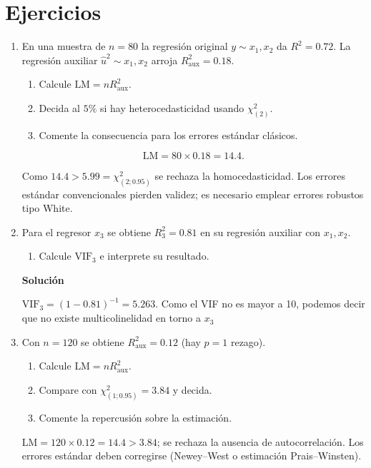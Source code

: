 \documentclass[10pt,a4paper]{article}
\begin{document}
\section{Ejercicios}

\begin{enumerate}
    \item En una muestra de $n=80$ la regresión original $y\sim x_1,x_2$ da
$R^{2}=0.72$.  
La regresión auxiliar $\hat u^{2}\sim x_1,x_2$ arroja 
$R^{2}_{\text{aux}}=0.18$.

\begin{enumerate}
\item Calcule $\text{LM}=nR^{2}_{\text{aux}}$.
\item Decida al $5\%$ si hay heterocedasticidad 
      usando $\chi^{2}_{(2)}$.
\item Comente la consecuencia para los errores estándar clásicos.
\end{enumerate}

\[
\text{LM}=80\times0.18=14.4.
\]

Como $14.4>5.99=\chi^{2}_{(2;0.95)}$
se rechaza la homocedasticidad.
Los errores estándar convencionales pierden validez; es necesario
emplear errores robustos tipo White.

\item 
Para el regresor $x_3$ se obtiene $R^{2}_{3}=0.81$
en su regresión auxiliar con $x_1,x_2$.

\begin{enumerate}
\item Calcule $\mathrm{VIF}_3$ e interprete su resultado.

\end{enumerate}

\textbf{Solución}

$\mathrm{VIF}_3=(1-0.81)^{-1}=5.263$.  Como el VIF no es mayor a 10, podemos decir que no existe multicolinelidad en torno a $x_3$

\item Con $n=120$ se obtiene $R^{2}_{\text{aux}}=0.12$
(hay $p=1$ rezago).

\begin{enumerate}
\item Calcule $\text{LM}=nR^{2}_{\text{aux}}$.
\item Compare con $\chi^{2}_{(1;0.95)}=3.84$ y decida.
\item Comente la repercusión sobre la estimación.
\end{enumerate}


$\text{LM}=120\times0.12=14.4>3.84$;  
se rechaza la ausencia de autocorrelación.  
Los errores estándar deben corregirse (Newey--West
o estimación Prais--Winsten).




\end{enumerate}

    
\end{document}
